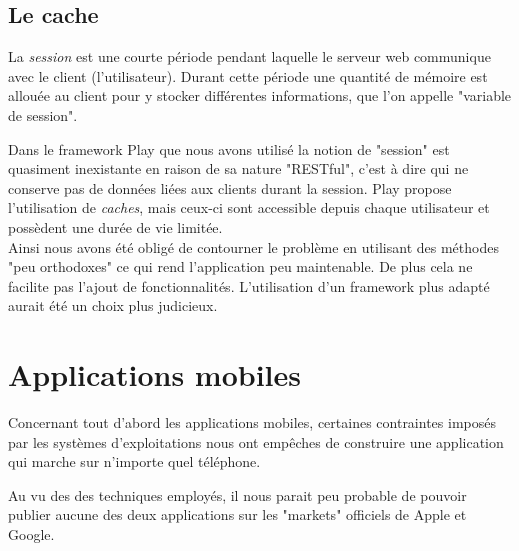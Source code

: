 \subsection{Le cache}

La \textit{session} est une courte période pendant laquelle le serveur web communique avec le client (l'utilisateur).
Durant cette période une quantité de mémoire est allouée au client pour y stocker différentes informations, que l'on appelle "variable de session".

Dans le framework Play que nous avons utilisé la notion de "session" est quasiment inexistante en raison de sa nature "RESTful", c'est à dire qui ne conserve pas de données liées aux clients durant la session.
Play propose l'utilisation de \textit{caches}, mais ceux-ci sont accessible depuis chaque utilisateur et possèdent une durée de vie limitée.
\\


Ainsi nous avons été obligé de contourner le problème en utilisant des méthodes "peu orthodoxes" ce qui rend l'application peu maintenable.
De plus cela ne facilite pas l'ajout de fonctionnalités.
L'utilisation d'un framework plus adapté aurait été un choix plus judicieux.
\\






\section{Applications mobiles}

Concernant tout d'abord les applications mobiles, certaines contraintes imposés par les systèmes d'exploitations nous ont empêches de construire une application qui marche sur n'importe quel téléphone.

Au vu des des techniques employés, il nous parait peu probable de pouvoir publier aucune des
deux applications sur les "markets" officiels de Apple et Google.
\\




